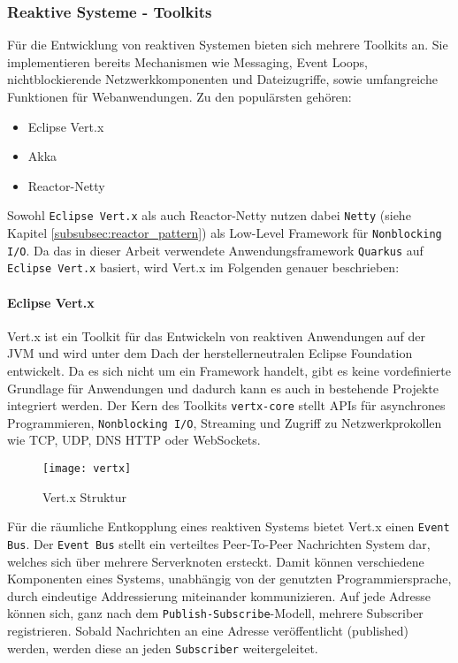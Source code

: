 \subsubsection{Reaktive Systeme - Toolkits}
\label{subsubsec:reaktive_systeme}
Für die Entwicklung von reaktiven Systemen bieten sich mehrere Toolkits an.
Sie implementieren bereits Mechanismen wie Messaging, Event Loops,
nichtblockierende Netzwerkkomponenten und Dateizugriffe, sowie umfangreiche Funktionen für Webanwendungen.
Zu den populärsten gehören:
\begin{itemize}
    \item Eclipse Vert.x \parencite{Vert.x}
    \item Akka \parencite{Akka}
    \item Reactor-Netty \parencite{ProjectReactor}
\end{itemize}
Sowohl \verb|Eclipse Vert.x| als auch Reactor-Netty nutzen dabei \verb|Netty|
(siehe Kapitel \ref{subsubsec:reactor_pattern}) als Low-Level Framework für \verb|Nonblocking I/O|.
Da das in dieser Arbeit verwendete Anwendungsframework \verb|Quarkus| auf \verb|Eclipse Vert.x| basiert, wird Vert.x im Folgenden genauer beschrieben:

\paragraph{Eclipse Vert.x}
Vert.x ist ein Toolkit für das Entwickeln von reaktiven Anwendungen auf der JVM und wird unter dem Dach der herstellerneutralen Eclipse Foundation entwickelt.
Da es sich nicht um ein Framework handelt, gibt es keine vordefinierte Grundlage für Anwendungen und dadurch kann es auch in bestehende Projekte
integriert werden.
Der Kern des Toolkits \verb|vertx-core| stellt APIs für asynchrones Programmieren, \verb|Nonblocking I/O|, Streaming und Zugriff zu
Netzwerkprokollen wie TCP, UDP, DNS HTTP oder WebSockets.
\begin{figure}[ht!]
    \centering
    \texttt{[image: vertx]}
    \caption{Vert.x Struktur \parencite{Ponge2020}}
    \label{fig:vertx}
\end{figure}

Für die räumliche Entkopplung eines reaktiven Systems bietet Vert.x einen \verb|Event Bus|.
Der \verb|Event Bus| stellt ein verteiltes Peer-To-Peer Nachrichten System dar, welches sich über mehrere Serverknoten ersteckt.
Damit können verschiedene Komponenten eines Systems, unabhängig von der genutzten Programmiersprache, durch eindeutige Addressierung miteinander kommunizieren.
Auf jede Adresse können sich, ganz nach dem \verb|Publish-Subscribe|-Modell, mehrere Subscriber registrieren. Sobald Nachrichten an eine
Adresse veröffentlicht (published) werden, werden diese an jeden \verb|Subscriber| weitergeleitet.

